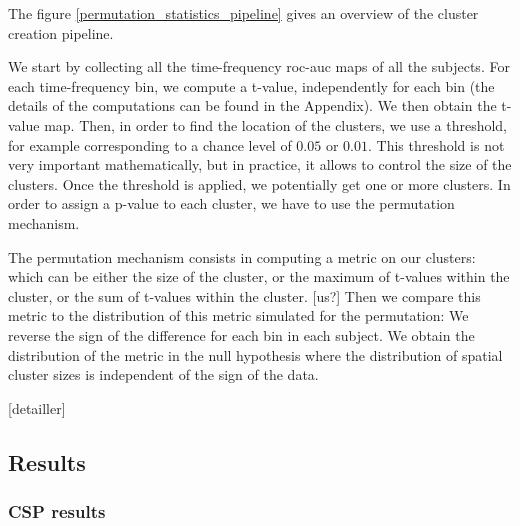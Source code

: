The figure \ref{permutation_statistics_pipeline} gives an overview of the cluster creation pipeline.

We start by collecting all the time-frequency roc-auc maps of all the subjects. For each time-frequency bin, we compute a t-value, independently for each bin (the details of the computations can be found in the Appendix). We then obtain the t-value map. Then, in order to find the location of the clusters, we use a threshold, for example corresponding to a chance level of $0.05$ or $0.01$. This threshold is not very important mathematically, but in practice, it allows to control the size of the clusters. Once the threshold is applied, we potentially get one or more clusters. In order to assign a p-value to each cluster, we have to use the permutation mechanism.

The permutation mechanism consists in computing a metric on our clusters: which can be either the size of the cluster, or the maximum of t-values within the cluster, or the sum of t-values within the cluster. [us?] Then we compare this metric to the distribution of this metric simulated for the permutation:
We reverse the sign of the difference for each bin in each subject. We obtain the distribution of the metric in the null hypothesis where the distribution of spatial cluster sizes is independent of the sign of the data.

[detailler]



\subsection{Results}

\subsubsection{CSP results}


